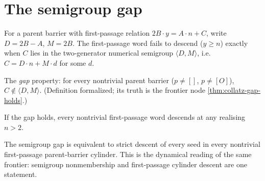 \section{The semigroup gap}

\begin{theorem}
  \label{thm:collatz-nondescent-iff}
  \leanok
  For a parent barrier with first-passage relation $2B\cdot y=A\cdot n+C$, write $D=2B-A$,
  $M=2B$. The first-passage word fails to descend ($y\ge n$) exactly when $C$ lies in the
  two-generator numerical semigroup $\langle D,M\rangle$, i.e. $C=D\cdot n+M\cdot d$ for some
  $d$.
\end{theorem}
\begin{proposition}
  \label{thm:collatz-gap}
  \leanok
  The \emph{gap} property: for every nontrivial parent barrier ($p\ne[]$, $p\ne[O]$), $C\notin
  \langle D,M\rangle$. (Definition formalized; its truth is the frontier node
  \cref{thm:collatz-gap-holds}.)
\end{proposition}
\begin{theorem}
  \label{thm:collatz-gap-implies-descent}
  \leanok
  If the gap holds, every nontrivial first-passage word descends at any realising $n>2$.
\end{theorem}
\begin{theorem}
  \label{thm:collatz-cylinder-seeds-descend}
  \leanok
  The semigroup gap is equivalent to strict descent of every seed in every
  nontrivial first-passage parent-barrier cylinder. This is the dynamical reading
  of the same frontier: semigroup nonmembership and first-passage cylinder
  descent are one statement.
\end{theorem}
